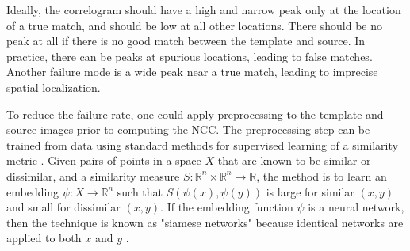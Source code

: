 \documentclass{article}
\begin{document}
Ideally, the correlogram should have a high and narrow peak only at the location of a true match, and should be low at all other locations. There should be no peak at all if there is no good match between the template and source. In practice, there can be peaks at spurious locations, leading to false matches. Another failure mode is a wide peak near a true match, leading to imprecise spatial localization.

To reduce the failure rate, one could apply preprocessing to the template and source images prior to computing the NCC. The preprocessing step can be trained from data using standard methods for supervised learning of a similarity metric \cite{kulis2013metric, yang2006distance}. Given pairs of points in a space $X$ that are known to be similar or dissimilar, and a similarity measure $S:\mathbb{R}^n\times\mathbb{R}^n\to \mathbb{R}$, the method is to learn an embedding $\psi:X\rightarrow \mathbb{R}^n$ such that $S(\psi(x),\psi(y))$ is large for similar $(x,y)$ and small for dissimilar $(x,y)$. If the embedding function $\psi$ is a neural network, then the technique is known as "siamese networks"\cite{bromley1993signature} because identical networks are applied to both $x$ and $y$ \cite{chopra2005learning}. 




\end{document}
